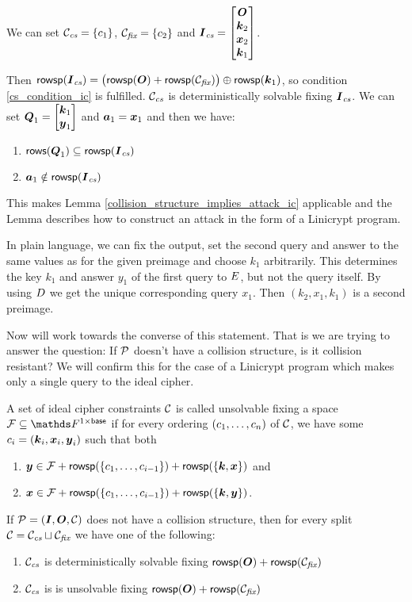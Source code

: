 We can set $\Ccs = \{c_1\}$, $\Cfix = \{c_2\}$ and $\Ics = \m{\O \\ \vk_2 \\ \vx_2 \\ \vk_1}$.

Then $\rowsp(\Ics) = \big( \rowsp(\O) + \rowsp(\Cfix) \big) \oplus \rowsp(\vk_1)$, so condition \eqref{cs_condition_ic} is fulfilled.
$\Ccs$ is deterministically solvable fixing $\Ics$.
We can set $\Q_1 = \m{\vk_1 \\ \vy_1}$ and $\va_1 = \vx_1$ and then we have: 
\begin{enumerate}
    \item $\rows(\Q_1) \subseteq \rowsp(\Ics)$
    \item $\va_1 \notin \rowsp(\Ics)$
\end{enumerate}

This makes Lemma \ref{collision_structure_implies_attack_ic} applicable and the Lemma describes how to construct an attack in the form of a Linicrypt program.

In plain language,
we can fix the output, set the second query and answer to the same values as for the given preimage and choose $k_1$ arbitrarily.
This determines the key $k_1$ and answer $y_1$ of the first query to $\E$, but not the query itself.
By using $\D$ we get the unique corresponding query $x_1$.
Then $(k_2, x_1, k_1)$ is a second preimage.

Now will work towards the converse of this statement.
That is we are trying to answer the question:
If $\P$ doesn't have a collision structure,
is it collision resistant?
We will confirm this for the case of a Linicrypt program which makes only a single query to the ideal cipher.

\begin{defn}
    A set of ideal cipher constraints $\C$ is called unsolvable fixing a space $\Fix \subseteq \Frowsp$ if for every ordering $(\dts c n)$ of $\C$,
    we have some $c_i = (\vk_i, \vx_i, \vy_i)$ such that both
    \begin{enumerate}
    \item    $\vy \in \Fix + \rowsp(\{\dts c {i-1}\}) + \rowsp(\{ \vk, \vx \})$ and
    \item    $\vx \in \Fix + \rowsp(\{\dts c {i-1}\}) + \rowsp(\{ \vk, \vy \})$.
    \end{enumerate}
\end{defn}

\begin{lemma}
\label{lemma_no_collision_structure}
    If $\P = (\I,\O,\C)$ does not have a collision structure,
    then for every split $\C = \Ccs \sqcup \Cfix$ we have one of the following:
    \begin{enumerate}
    \item $\Ccs$ is deterministically solvable fixing $\rowsp(\O) + \rowsp(\Cfix)$
    \item $\Ccs$ is is unsolvable fixing $\rowsp(\O) + \rowsp(\Cfix)$
    \end{enumerate}
\end{lemma}


